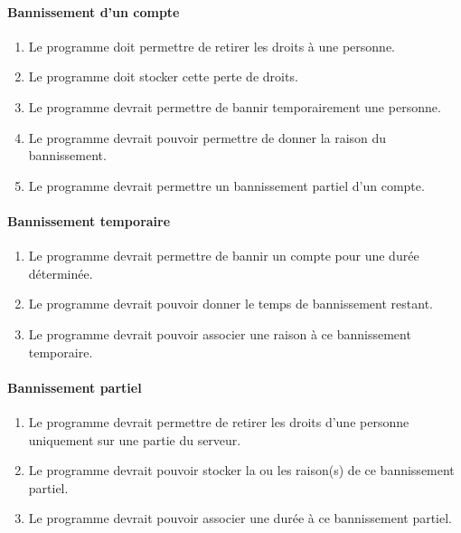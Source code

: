 \documentclass[10pt,a4paper]{report}
\begin{document}
\paragraph{Bannissement d'un compte}
	\begin{enumerate}
		\item Le programme doit permettre de retirer les droits à une personne.
		\item Le programme doit stocker cette perte de droits.
		\item Le programme devrait permettre de bannir temporairement une personne.
		\item Le programme devrait pouvoir permettre de donner la raison du bannissement.
		\item Le programme devrait permettre un bannissement partiel d'un compte.
	\end{enumerate}
	
\paragraph{Bannissement temporaire}
	\begin{enumerate}
		\item Le programme devrait permettre de bannir un compte pour une durée déterminée.
		\item Le programme devrait pouvoir donner le temps de bannissement restant.
		\item Le programme devrait pouvoir associer une raison à ce bannissement temporaire.
	\end{enumerate}
	
\paragraph{Bannissement partiel}
	\begin{enumerate}
		\item Le programme devrait permettre de retirer les droits d'une personne uniquement sur une partie du serveur.
		\item Le programme devrait pouvoir stocker la ou les raison(s) de ce bannissement partiel.
		\item Le programme devrait pouvoir associer une durée à ce bannissement partiel.
	\end{enumerate}
	
\end{document}
